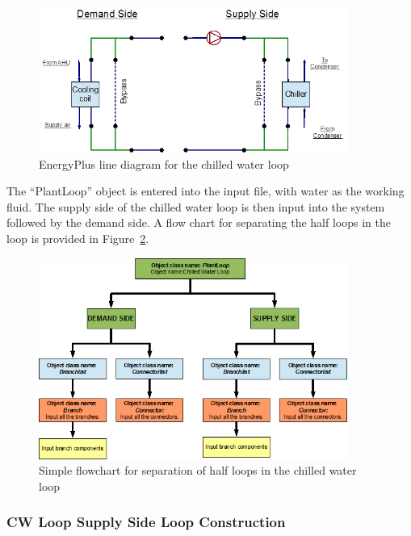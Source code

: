 \begin{figure}[hbtp] %
\centering
\includegraphics[width=0.9\textwidth, height=0.9\textheight, keepaspectratio=true]{media/image016.png}
\caption{EnergyPlus line diagram for the chilled water loop \protect \label{fig:energyplus-line-diagram-for-the-chilled-water}}
\end{figure}

The ``PlantLoop'' object is entered into the input file, with water as the working fluid. The supply side of the chilled water loop is then input into the system followed by the demand side. A flow chart for separating the half loops in the loop is provided in Figure~\ref{fig:simple-flowchart-for-separation-of-half-loops}.

\begin{figure}[hbtp] %
\centering
\includegraphics[width=0.9\textwidth, height=0.9\textheight, keepaspectratio=true]{media/image017.png}
\caption{Simple flowchart for separation of half loops in the chilled water loop \protect \label{fig:simple-flowchart-for-separation-of-half-loops}}
\end{figure}

\subsubsection{CW Loop Supply Side Loop Construction}\label{cw-loop-supply-side-loop-construction}

